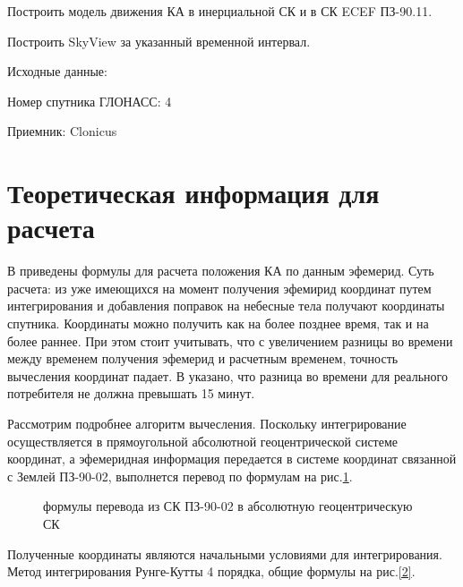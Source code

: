 \documentclass[]{article}
\begin{document}
Построить модель движения КА в инерциальной СК и в СК ECEF ПЗ-90.11. 

Построить SkyView за указанный временной интервал.

Исходные данные: 

Номер спутника ГЛОНАСС: 4

Приемник: Clonicus

\section{Теоретическая информация для расчета}
В \cite{ICD} приведены формулы для расчета положения КА по данным эфемерид. Суть расчета: из уже имеющихся на момент получения эфемирид координат путем интегрирования и добавления поправок на небесные тела получают координаты спутника. Координаты можно получить как на более позднее время, так и на более раннее. При этом стоит учитывать, что с увеличением разницы во времени между временем получения эфемерид и расчетным временем, точность вычесления координат падает. В \cite{ICD} указано, что разница во времени для реального потребителя не должна превышать 15 минут.  

Рассмотрим подробнее  алгоритм вычесления.
Поскольку интегрирование осуществляется в прямоугольной абсолютной геоцентрической системе координат, а эфемеридная информация передается в системе координат связанной с Землей  ПЗ-90-02, выполнется перевод по формулам на рис.\ref{1}.

\begin{figure}[h!]
	
	\caption{формулы перевода из СК ПЗ-90-02 в абсолютную геоцентрическую СК }
	\label{1}
\end{figure}

Полученные координаты являются начальными условиями для интегрирования. Метод интегрирования Рунге-Кутты 4 порядка, общие формулы на рис.\ref{2}.
\end{document}
